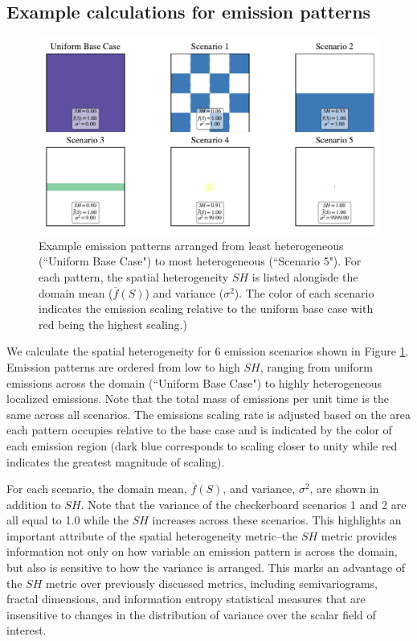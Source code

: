 \subsection{Example calculations for emission patterns}

\begin{figure}[!t]
	\centering
	\includegraphics[width=\textwidth]{figures/chapter2/SH-scenarios-all.pdf}
	\caption{Example emission patterns arranged from least heterogeneous (``Uniform Base Case") to most heterogeneous (``Scenario 5").  For each pattern, the spatial heterogeneity $SH$ is listed alongisde the domain mean ($\overline{f}(S)$) and variance ($\sigma^2$). The color of each scenario indicates the emission scaling relative to the uniform base case with red being the highest scaling.)}
	\label{fig:emission-patterns}
\end{figure}

We calculate the spatial heterogeneity for 6 emission scenarios shown in Figure \ref{fig:emission-patterns}. Emission patterns are ordered from low to high $SH$, ranging from uniform emissions across the domain (``Uniform Base Case") to highly heterogeneous localized emissions. Note that the total mass of emissions per unit time is the same across all scenarios. The emissions scaling rate is adjusted based on the area each pattern occupies relative to the base case and is indicated by the color of each emission region (dark blue corresponds to scaling closer to unity while red indicates the greatest magnitude of scaling). 

For each scenario, the domain mean, $\overline{f}(S)$, and variance, $\sigma^2$, are shown in addition to $SH$. Note that the variance of the checkerboard scenarios 1 and 2 are all equal to 1.0 while the $SH$ increases across these scenarios. This highlights an important attribute of the spatial heterogeneity metric--the $SH$ metric provides information not only on how variable an emission pattern is across the domain, but also is sensitive to how the variance is arranged. This marks an advantage of the $SH$ metric over previously discussed metrics, including semivariograms, fractal dimensions, and information entropy statistical measures that are insensitive to changes in the distribution of variance over the scalar field of interest.
